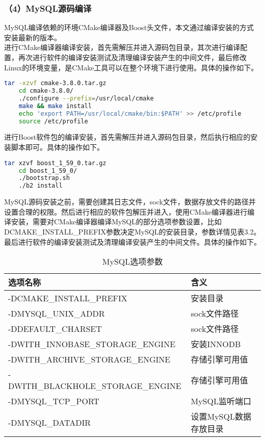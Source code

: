 	\subsubsection{（4）MySQL源码编译}
	MySQL编译依赖的环境CMake编译器及Boost头文件，本文通过编译安装的方式安装最新的版本。\\
	\indent 进行CMake编译器编译安装，首先需解压并进入源码包目录，其次进行编译配置，再次进行软件的编译安装测试及清理编译安装产生的中间文件，最后修改Linux的环境变量，是CMake工具可以在整个环境下进行使用。具体的操作如下。\\
	\begin{lstlisting}[language=bash]
	tar -xzvf cmake-3.8.0.tar.gz
	cd cmake-3.8.0/
	./configure --prefix=/usr/local/cmake
	make && make install
	echo 'export PATH=/usr/local/cmake/bin:$PATH' >> /etc/profile
	source /etc/profile
	\end{lstlisting}
	\indent 进行Boost软件包的编译安装，首先需解压并进入源码包目录，然后执行相应的安装脚本即可。具体的操作如下。\\
	\begin{lstlisting}[language=bash]
	tar xzvf boost_1_59_0.tar.gz
	cd boost_1_59_0/
	./bootstrap.sh
	./b2 install
	\end{lstlisting}
	\indent MySQL源码安装之前，需要创建其日志文件，sock文件，数据存放文件的路径并设置合理的权限。然后进行相应的软件包解压并进入，使用CMake编译器进行编译安装，需要对CMake编译器编译MySQL的部分选项参数设置，比如DCMAKE\_INSTALL\_PREFIX参数决定MySQL的安装目录，参数详情见表3.2。最后进行软件的编译安装测试及清理编译安装产生的中间文件。具体的操作如下。\\
	\begin{table}[!htbp]
		\centering
		\begin{tabular}{ll}	
			\toprule
			选项名称& 含义\\
			\midrule
			-DCMAKE\_INSTALL\_PREFIX&安装目录\\
			-DMYSQL\_UNIX\_ADDR&sock文件路径\\
			-DDEFAULT\_CHARSET&sock文件路径 \\
			-DWITH\_INNOBASE\_STORAGE\_ENGINE&安装INNODB\\
			-DWITH\_ARCHIVE\_STORAGE\_ENGINE&存储引擎可用值\\
			-DWITH\_BLACKHOLE\_STORAGE\_ENGINE&存储引擎可用值\\
			-DMYSQL\_TCP\_PORT&MySQL监听端口\\
			-DMYSQL\_DATADIR&设置MySQL数据存放目录\\
			\bottomrule
		\end{tabular}
		\caption{MySQL选项参数}
	\end{table}\\
